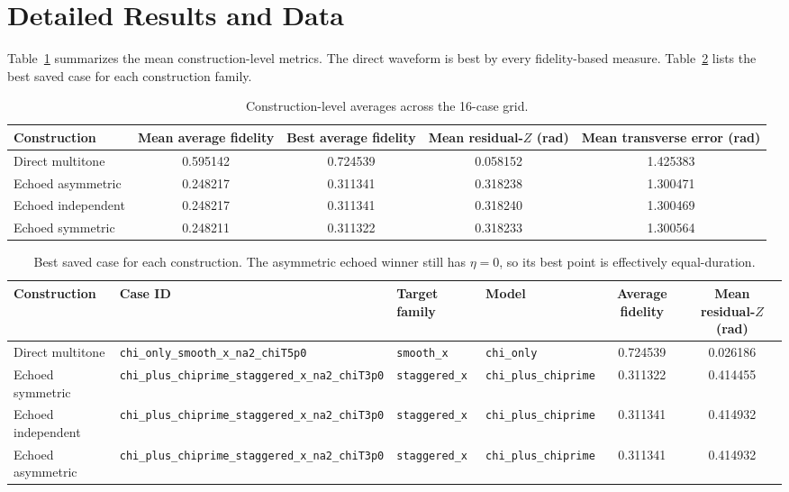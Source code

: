 \documentclass[aps,pra,twocolumn,reprint,floatfix,amsmath,amssymb]{revtex4-2}
\begin{document}



\appendix

\section{Detailed Results and Data}
Table~\ref{tab:construction_summary} summarizes the mean construction-level metrics. The direct waveform is best by every fidelity-based measure. Table~\ref{tab:best_cases} lists the best saved case for each construction family.

\begin{table}[h]
\centering
\caption{Construction-level averages across the 16-case grid.}
\label{tab:construction_summary}
\begin{tabular}{@{}lcccc@{}}
\toprule
Construction & Mean average fidelity & Best average fidelity & Mean residual-$Z$ (rad) & Mean transverse error (rad) \\
\midrule
Direct multitone & 0.595142 & 0.724539 & 0.058152 & 1.425383 \\
Echoed asymmetric & 0.248217 & 0.311341 & 0.318238 & 1.300471 \\
Echoed independent & 0.248217 & 0.311341 & 0.318240 & 1.300469 \\
Echoed symmetric & 0.248211 & 0.311322 & 0.318233 & 1.300564 \\
\bottomrule
\end{tabular}
\end{table}

\begin{table}[h]
\centering
\caption{Best saved case for each construction. The asymmetric echoed winner still has $\eta=0$, so its best point is effectively equal-duration.}
\label{tab:best_cases}
\begin{tabular}{@{}llllcc@{}}
\toprule
Construction & Case ID & Target family & Model & Average fidelity & Mean residual-$Z$ (rad) \\
\midrule
Direct multitone & \texttt{chi\_only\_smooth\_x\_na2\_chiT5p0} & \texttt{smooth\_x} & \texttt{chi\_only} & 0.724539 & 0.026186 \\
Echoed symmetric & \texttt{chi\_plus\_chiprime\_staggered\_x\_na2\_chiT3p0} & \texttt{staggered\_x} & \texttt{chi\_plus\_chiprime} & 0.311322 & 0.414455 \\
Echoed independent & \texttt{chi\_plus\_chiprime\_staggered\_x\_na2\_chiT3p0} & \texttt{staggered\_x} & \texttt{chi\_plus\_chiprime} & 0.311341 & 0.414932 \\
Echoed asymmetric & \texttt{chi\_plus\_chiprime\_staggered\_x\_na2\_chiT3p0} & \texttt{staggered\_x} & \texttt{chi\_plus\_chiprime} & 0.311341 & 0.414932 \\
\bottomrule
\end{tabular}
\end{table}
\end{document}
